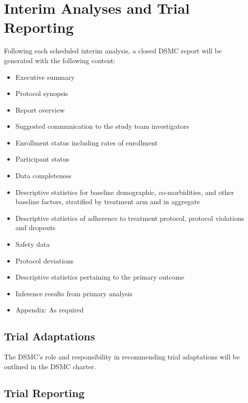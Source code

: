 \documentclass[
]{article}
\providecommand{\tightlist}{%
  \setlength{\itemsep}{0pt}\setlength{\parskip}{0pt}}
\begin{document}
\clearpage

\hypertarget{interim-analyses-and-trial-reporting}{%
  \section{Interim Analyses and Trial Reporting}\label{interim-analyses-and-trial-reporting}}

Following each scheduled interim analysis, a closed DSMC report will be generated with the following content:

\begin{itemize}\tightlist
  \item
        Executive summary
  \item
        Protocol synopsis
  \item
        Report overview
  \item
        Suggested communication to the study team investigators
  \item
        Enrollment status including rates of enrollment
  \item
        Participant status
  \item 
        Data completeness
  \item
        Descriptive statistics for baseline demographic, co-morbidities, and other baseline factors, stratified by treatment arm and in aggregate
  \item
        Descriptive statistics of adherence to treatment protocol, protocol violations and dropouts
  \item
        Safety data
  \item
        Protocol deviations
  \item 
        Descriptive statistics pertaining to the primary outcome
  \item
        Inference results from primary analysis
  \item
        Appendix: As required
\end{itemize}


\hypertarget{trial-adaptations}{%
  \subsection{Trial Adaptations}\label{trial-adaptations}}

The DSMC's role and responsibility in recommending trial adaptations will be outlined in the DSMC charter.

\hypertarget{trial-reporting}{%
  \subsection{Trial Reporting}\label{trial-reporting}}
\end{document}
